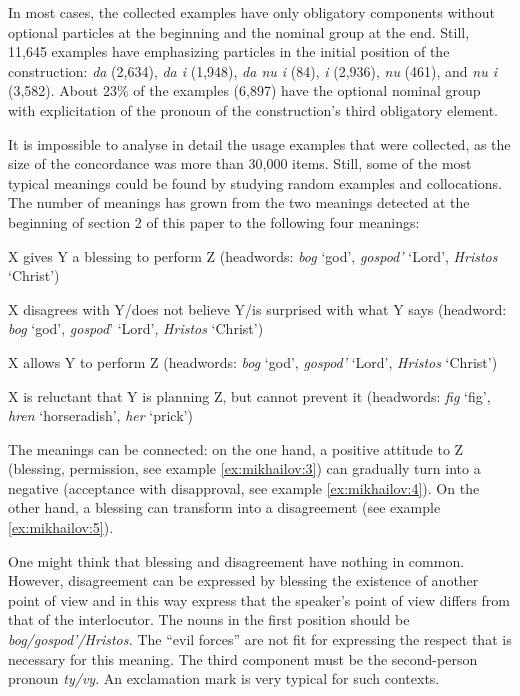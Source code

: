 \documentclass[output=paper]{langscibook}
\begin{document}
In most cases, the collected examples have only obligatory components without optional particles at the beginning and the nominal group at the end. Still, 11,645 examples have emphasizing particles in the initial position of the construction: \textit{da} (2,634), \textit{da i} (1,948), \textit{da nu i} (84), \textit{i} (2,936), \textit{nu} (461), and \textit{nu i} (3,582). About 23\% of the examples (6,897) have the optional nominal group with explicitation of the pronoun of the construction’s third obligatory element.

It is impossible to analyse in detail the usage examples that were collected, as the size of the concordance was more than 30,000 items. Still, some of the most typical meanings could be found by studying random examples and collocations. The number of meanings has grown from the two meanings detected at the beginning of section 2 of this paper to the following four meanings:

\begin{description}\sloppy
\item [Blessing:] X gives Y a blessing to perform Z (headwords: \textit{bog} ‘god’, \textit{gospod’} ‘Lord’, \textit{Hristos} ‘Christ’)
\item [Disagreement, disbelief, surprise:] X disagrees with Y\slash does not believe Y\slash is surprised with what Y says (headword: \textit{bog} ‘god’, \textit{gospod}’ ‘Lord’, \textit{Hristos} ‘Christ’)
\item [Permission:] X allows Y to perform Z (headwords: \textit{bog} ‘god’, \textit{gospod’} ‘Lord’, \textit{Hristos} ‘Christ’)
\item [Acceptance with disapproval:] X is reluctant that Y is planning Z, but cannot prevent it (headwords: \textit{fig} ‘fig’, \textit{hren} ‘horseradish’, \textit{her} ‘prick’)
\end{description}

The meanings can be connected: on the one hand, a positive attitude to Z (blessing, permission, see example \ref{ex:mikhailov:3}) can gradually turn into a negative (acceptance with disapproval, see example \ref{ex:mikhailov:4}). On the other hand, a blessing can transform into a disagreement (see example \ref{ex:mikhailov:5}).

One might think that blessing and disagreement have nothing in common. However, disagreement can be expressed by blessing the existence of another point of view and in this way express that the speaker’s point of view differs from that of the interlocutor. The nouns in the first position should be \textit{bog/gospod’/Hristos.} The “evil forces” are not fit for expressing the respect that is necessary for this meaning. The third component must be the second-person pronoun \textit{ty/vy}. An exclamation mark is very typical for such contexts.
\end{document}

